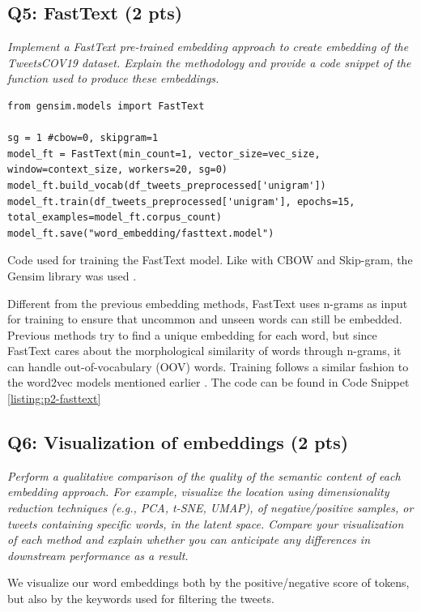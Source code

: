 \subsection*{Q5: FastText (2 pts)}
\textit{Implement a FastText pre-trained embedding approach to create embedding of the TweetsCOV19 dataset. Explain the methodology and provide a code
snippet of the function used to produce these embeddings.}


\begin{listing*}
\begin{verbatim}
from gensim.models import FastText

sg = 1 #cbow=0, skipgram=1
model_ft = FastText(min_count=1, vector_size=vec_size, window=context_size, workers=20, sg=0)
model_ft.build_vocab(df_tweets_preprocessed['unigram'])
model_ft.train(df_tweets_preprocessed['unigram'], epochs=15, total_examples=model_ft.corpus_count)
model_ft.save("word_embedding/fasttext.model")
\end{verbatim}
\caption{Code used for training the FastText model. Like with CBOW and Skip-gram, the Gensim library was used \cite{gensim}.}
\label{listing:p2-fasttext}
\end{listing*}

Different from the previous embedding methods, FastText \cite{fasttext} uses n-grams as input for training to ensure that uncommon and unseen words can still be embedded. Previous methods try to find a unique embedding for each word, but since FastText cares about the morphological similarity of words through n-grams, it can handle out-of-vocabulary (OOV) words. Training follows a similar fashion to the word2vec models mentioned earlier \cite{cbowsgram}.
The code can be found in Code Snippet \ref{listing:p2-fasttext}

\subsection*{Q6: Visualization of embeddings (2 pts)}
\textit{Perform a qualitative comparison of the quality of the semantic content of each embedding approach. For example, visualize the location using dimensionality reduction techniques (e.g., PCA, t-SNE, UMAP), of negative/positive samples, or tweets containing specific words, in the latent space. Compare your visualization of each method and explain whether you can anticipate any differences in downstream performance as a result. \cite{tsne, umap}}

We visualize our word embeddings both by the positive/negative score of tokens, but also by the keywords used for filtering the tweets.

